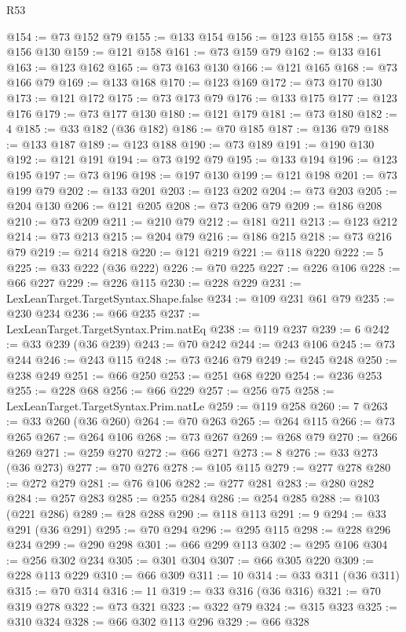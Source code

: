 \begin{lexlean}{R53}
\begin{coremodule}
@154 := @73 @152 @79
@155 := @133 @154
@156 := @123 @155
@158 := @73 @156 @130
@159 := @121 @158
@161 := @73 @159 @79
@162 := @133 @161
@163 := @123 @162
@165 := @73 @163 @130
@166 := @121 @165
@168 := @73 @166 @79
@169 := @133 @168
@170 := @123 @169
@172 := @73 @170 @130
@173 := @121 @172
@175 := @73 @173 @79
@176 := @133 @175
@177 := @123 @176
@179 := @73 @177 @130
@180 := @121 @179
@181 := @73 @180
@182 := 4
@185 := @33 @182 (@36 @182)
@186 := @70 @185
@187 := @136 @79
@188 := @133 @187
@189 := @123 @188
@190 := @73 @189
@191 := @190 @130
@192 := @121 @191
@194 := @73 @192 @79
@195 := @133 @194
@196 := @123 @195
@197 := @73 @196
@198 := @197 @130
@199 := @121 @198
@201 := @73 @199 @79
@202 := @133 @201
@203 := @123 @202
@204 := @73 @203
@205 := @204 @130
@206 := @121 @205
@208 := @73 @206 @79
@209 := @186 @208
@210 := @73 @209
@211 := @210 @79
@212 := @181 @211
@213 := @123 @212
@214 := @73 @213
@215 := @204 @79
@216 := @186 @215
@218 := @73 @216 @79
@219 := @214 @218
@220 := @121 @219
@221 := @118 @220
@222 := 5
@225 := @33 @222 (@36 @222)
@226 := @70 @225
@227 := @226 @106
@228 := @66 @227
@229 := @226 @115
@230 := @228 @229
@231 := LexLeanTarget.TargetSyntax.Shape.false
@234 := @109 @231 @61 @79
@235 := @230 @234
@236 := @66 @235
@237 := LexLeanTarget.TargetSyntax.Prim.natEq
@238 := @119 @237
@239 := 6
@242 := @33 @239 (@36 @239)
@243 := @70 @242
@244 := @243 @106
@245 := @73 @244
@246 := @243 @115
@248 := @73 @246 @79
@249 := @245 @248
@250 := @238 @249
@251 := @66 @250
@253 := @251 @68 @220
@254 := @236 @253
@255 := @228 @68
@256 := @66 @229
@257 := @256 @75
@258 := LexLeanTarget.TargetSyntax.Prim.natLe
@259 := @119 @258
@260 := 7
@263 := @33 @260 (@36 @260)
@264 := @70 @263
@265 := @264 @115
@266 := @73 @265
@267 := @264 @106
@268 := @73 @267
@269 := @268 @79
@270 := @266 @269
@271 := @259 @270
@272 := @66 @271
@273 := 8
@276 := @33 @273 (@36 @273)
@277 := @70 @276
@278 := @105 @115
@279 := @277 @278
@280 := @272 @279
@281 := @76 @106
@282 := @277 @281
@283 := @280 @282
@284 := @257 @283
@285 := @255 @284
@286 := @254 @285
@288 := @103 (@221 @286)
@289 := @28 @288
@290 := @118 @113
@291 := 9
@294 := @33 @291 (@36 @291)
@295 := @70 @294
@296 := @295 @115
@298 := @228 @296 @234
@299 := @290 @298
@301 := @66 @299 @113
@302 := @295 @106
@304 := @256 @302 @234
@305 := @301 @304
@307 := @66 @305 @220
@309 := @228 @113 @229
@310 := @66 @309
@311 := 10
@314 := @33 @311 (@36 @311)
@315 := @70 @314
@316 := 11
@319 := @33 @316 (@36 @316)
@321 := @70 @319 @278
@322 := @73 @321
@323 := @322 @79
@324 := @315 @323
@325 := @310 @324
@328 := @66 @302 @113 @296
@329 := @66 @328

\end{coremodule}
\end{lexlean}
